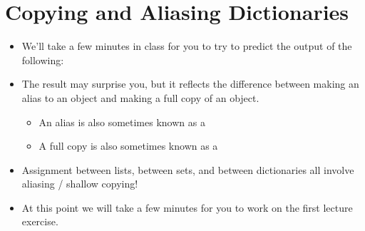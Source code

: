 \documentclass[letterpaper,10pt,english]{sphinxmanual}
\begin{document}
\section{Copying and Aliasing Dictionaries}
\label{\detokenize{lecture_notes/lec17_dictionaries2:copying-and-aliasing-dictionaries}}\begin{itemize}
\item {} 
We’ll take a few minutes in class for you to try to predict the
output of the following:

%
\begin{sphinxVerbatim}[commandchars=\\\{\}]
  
\PYG{p}{[}\PYG{p}{]}  
  \PYG{p}{[}\PYG{p}{]}
\PYG{p}{[}\PYG{p}{]}  
\PYG{p}{[}\PYG{p}{]}  
 \PYG{p}{[}\PYG{p}{]}
\end{sphinxVerbatim}

\item {} 
The result may surprise you, but it reflects the difference between
making an alias to an object and making a full copy of an object.
\begin{itemize}
\item {} 
An alias is also sometimes known as a 

\item {} 
A full copy is also sometimes known as a 

\end{itemize}

\item {} 
Assignment between lists, between sets, and between dictionaries all
involve aliasing / shallow copying!

\item {} 
At this point we will take a few minutes for you to work on the
first lecture exercise.

\end{itemize}
\end{document}
